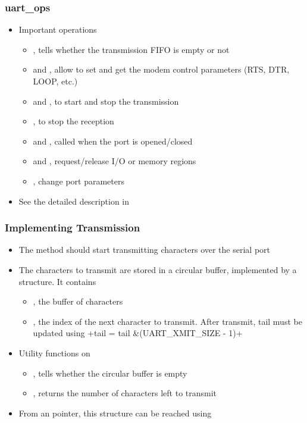 \begin{frame}
  \frametitle{uart\_ops}
  \begin{itemize}
  \item Important operations
    \begin{itemize}
    \item {}, tells whether the transmission FIFO is
      empty or not
    \item {} and , allow to set and
      get the modem control parameters (RTS, DTR, LOOP, etc.)
    \item {} and , to start and stop
      the transmission
    \item {}, to stop the reception
    \item {} and , called when the port
      is opened/closed
    \item {} and ,
      request/release I/O or memory regions
    \item {}, change port parameters
    \end{itemize}
  \item See the detailed description in
  \end{itemize}
\end{frame}

\begin{frame}[fragile]
  \frametitle{Implementing Transmission}
  \begin{itemize}
  \item The  method should start transmitting
    characters over the serial port
  \item The characters to transmit are stored in a circular buffer,
    implemented by a  structure. It contains
    \begin{itemize}
    \item {}, the buffer of characters
    \item {}, the index of the next character to
      transmit. After transmit, tail must be updated using
      +tail = tail &(UART_XMIT_SIZE - 1)+
    \end{itemize}
  \item Utility functions on 
    \begin{itemize}
    \item {}, tells whether the circular buffer
      is empty
    \item {}, returns the number of
      characters left to transmit
    \end{itemize}
  \item From an  pointer, this structure can be
    reached using 
  \end{itemize}
\end{frame}

